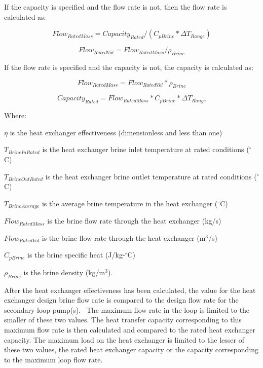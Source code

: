 If the capacity is specified and the flow rate is not, then the flow rate is calculated as:

\begin{equation}
Flow_{RatedMass} = Capacity_{Rated}/(C_{pBrine} * \Delta T_{Range})
\end{equation}

\begin{equation}
Flow_{RatedVol} = Flow_{RatedMass} / {\rho}_{Brine}
\end{equation}

If the flow rate is specified and the capacity is not, the capacity is calculated as:

\begin{equation}
Flow_{RatedMass} = Flow_{RatedVol}*{\rho}_{Brine}
\end{equation}

\begin{equation}
Capacity_{Rated} = Flow_{RatedMass} * C_{pBrine} * \Delta T_{Range}
\end{equation}

Where:

\(\eta\) is the heat exchanger effectiveness (dimensionless and less than one)

\(T_{BrineInRated}\) is the heat exchanger brine inlet temperature at rated conditions (\(^{\circ}\)C)

\(T_{BrineOutRated}\) is the heat exchanger brine outlet temperature at rated conditions (\(^{\circ}\)C)

\(T_{BrineAverage}\) is the average brine temperature in the heat exchanger (\(^{\circ}\)C)

\(Flow_{RatedMass}\) is the brine flow rate through the heat exchanger (kg/s)

\(Flow_{RatedVol}\) is the brine flow rate through the heat exchanger (m\(^{3}\)/s)

\(C_{pBrine}\) is the brine specific heat (J/kg-\(^{\circ}\)C)

\(\rho_{Brine}\) is the brine density (kg/m\(^{3}\)).

After the heat exchanger effectiveness has been calculated, the value for the heat exchanger design brine flow rate is compared to the design flow rate for the secondary loop pump(s).~ The maximum flow rate in the loop is limited to the smaller of these two values. The heat transfer capacity corresponding to this maximum flow rate is then calculated and compared to the rated heat exchanger capacity. The maximum load on the heat exchanger is limited to the lesser of these two values, the rated heat exchanger capacity or the capacity corresponding to the maximum loop flow rate.

